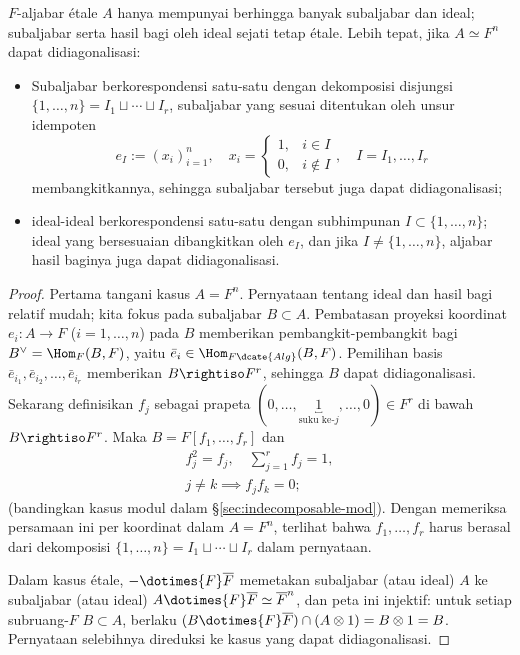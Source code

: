 \begin{lemma}\label{prop:etale-algebra-subalgebras}
	$F$-aljabar étale $A$ hanya mempunyai berhingga banyak subaljabar dan ideal; subaljabar serta hasil bagi oleh ideal sejati tetap étale. Lebih tepat, jika $A \simeq F^n$ dapat didiagonalisasi:
	\begin{itemize}
		\item Subaljabar berkorespondensi satu-satu dengan dekomposisi disjungsi $\{1, \ldots, n\} = I_1 \sqcup \cdots \sqcup I_r$, subaljabar yang sesuai ditentukan oleh unsur idempoten
			\[ e_I := (x_i)_{i=1}^n, \quad x_i = \begin{cases} 1, & i \in I \\ 0, & i \notin I \end{cases}, \quad I = I_1, \ldots, I_r \]
			membangkitkannya, sehingga subaljabar tersebut juga dapat didiagonalisasi;
		\item ideal-ideal berkorespondensi satu-satu dengan subhimpunan $I \subset \{1, \ldots, n\}$; ideal yang bersesuaian dibangkitkan oleh $e_I$, dan jika $I \neq \{1, \ldots, n\}$, aljabar hasil baginya juga dapat didiagonalisasi.
	\end{itemize}
\end{lemma}
\begin{proof}
	Pertama tangani kasus $A = F^n$. Pernyataan tentang ideal dan hasil bagi relatif mudah; kita fokus pada subaljabar $B \subset A$. Pembatasan proyeksi koordinat $e_i: A \to F$ ($i=1, \ldots, n$) pada $B$ memberikan pembangkit-pembangkit bagi $B^\vee = \Hom_F(B,F)$, yaitu $\bar{e}_i \in \Hom_{F\dcate{Alg}}(B, F)$. Pemilihan basis $\bar{e}_{i_1}, \bar{e}_{i_2}, \ldots, \bar{e}_{i_r}$ memberikan $B \rightiso F^r$, sehingga $B$ dapat didiagonalisasi. Sekarang definisikan $f_j$ sebagai prapeta $(0, \ldots, \underbracket{1}_{\text{suku ke-$j$}}, \ldots, 0) \in F^r$ di bawah $B \rightiso F^r$. Maka $B = F[f_1, \ldots, f_r]$ dan
	\begin{gather*}
		f_j^2 = f_j, \quad \sum_{j=1}^r f_j = 1, \\
		j \neq k \implies f_j f_k = 0;
	\end{gather*}
	(bandingkan kasus modul dalam \S\ref{sec:indecomposable-mod}). Dengan memeriksa persamaan ini per koordinat dalam $A = F^n$, terlihat bahwa $f_1, \ldots, f_r$ harus berasal dari dekomposisi $\{1, \ldots, n\} = I_1 \sqcup \cdots \sqcup I_r$ dalam pernyataan.
	
	Dalam kasus étale, $- \dotimes{F} \overline{F}$ memetakan subaljabar (atau ideal) $A$ ke subaljabar (atau ideal) $A \dotimes{F} \overline{F} \simeq \overline{F}^n$, dan peta ini injektif: untuk setiap subruang-$F$ $B \subset A$, berlaku $(B \dotimes{F} \overline{F}) \cap (A \otimes 1) = B \otimes 1 = B$. Pernyataan selebihnya direduksi ke kasus yang dapat didiagonalisasi.
\end{proof}

